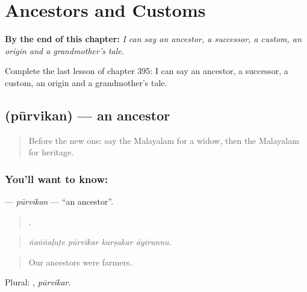 
\chapter{Ancestors and Customs}
\label{ch:ml-ancestors-and-customs}

\begin{chapteropening}
\textbf{By the end of this chapter:} \emph{I can say an ancestor, a successor, a custom, an origin and a grandmother's tale.}

Complete the last lesson of chapter 395: I can say an ancestor, a successor, a custom, an origin and a grandmother's tale.
\end{chapteropening}

\section[\texorpdfstring{\ml{പൂർവികൻ} (pūrvikan)}{പൂർവികൻ (pūrvikan)}]{ (pūrvikan) — an ancestor}

\label{lesson:ML-C395-purvikan}



\begin{quote}
Before the new one: say the Malayalam for a widow, then the Malayalam for heritage.
\end{quote}

\subsection*{You'll want to know: }
\textbf{} — \emph{pūrvikan} — \textquotedblleft{}an ancestor\textquotedblright{}.

\begin{quote}
   .
\end{quote}

\begin{quote}
\emph{ñaṅṅaḷuṭe pūrvikar karṣakar āyirunnu.}
\end{quote}

\begin{quote}
Our ancestors were farmers.
\end{quote}

Plural: , \emph{pūrvikar}.

